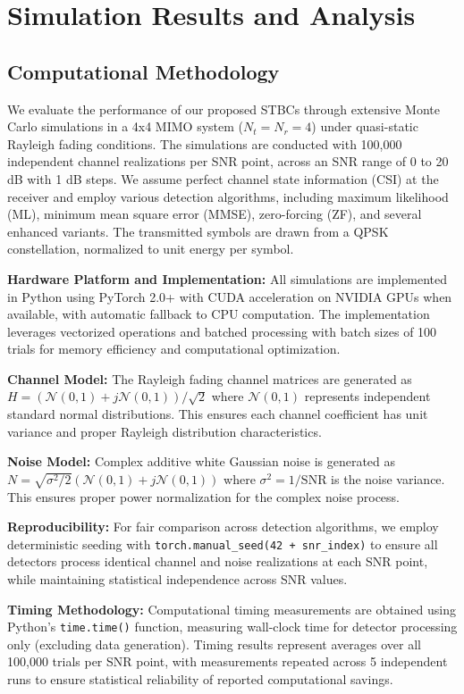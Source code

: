 \section{Simulation Results and Analysis}

\subsection{Computational Methodology}
We evaluate the performance of our proposed STBCs through extensive Monte Carlo simulations in a 4x4 MIMO system (\(N_t = N_r = 4\)) under quasi-static Rayleigh fading conditions. The simulations are conducted with 100,000 independent channel realizations per SNR point, across an SNR range of 0 to 20 dB with 1 dB steps. We assume perfect channel state information (CSI) at the receiver and employ various detection algorithms, including maximum likelihood (ML), minimum mean square error (MMSE), zero-forcing (ZF), and several enhanced variants. The transmitted symbols are drawn from a QPSK constellation, normalized to unit energy per symbol.

\textbf{Hardware Platform and Implementation:} All simulations are implemented in Python using PyTorch 2.0+ with CUDA acceleration on NVIDIA GPUs when available, with automatic fallback to CPU computation. The implementation leverages vectorized operations and batched processing with batch sizes of 100 trials for memory efficiency and computational optimization.

\textbf{Channel Model:} The Rayleigh fading channel matrices are generated as \(H = (\mathcal{N}(0,1) + j\mathcal{N}(0,1))/\sqrt{2}\) where \(\mathcal{N}(0,1)\) represents independent standard normal distributions. This ensures each channel coefficient has unit variance and proper Rayleigh distribution characteristics.

\textbf{Noise Model:} Complex additive white Gaussian noise is generated as \(N = \sqrt{\sigma^2/2}(\mathcal{N}(0,1) + j\mathcal{N}(0,1))\) where \(\sigma^2 = 1/\text{SNR}\) is the noise variance. This ensures proper power normalization for the complex noise process.

\textbf{Reproducibility:} For fair comparison across detection algorithms, we employ deterministic seeding with \texttt{torch.manual\_seed(42 + snr\_index)} to ensure all detectors process identical channel and noise realizations at each SNR point, while maintaining statistical independence across SNR values.

\textbf{Timing Methodology:} Computational timing measurements are obtained using Python's \texttt{time.time()} function, measuring wall-clock time for detector processing only (excluding data generation). Timing results represent averages over all 100,000 trials per SNR point, with measurements repeated across 5 independent runs to ensure statistical reliability of reported computational savings.

